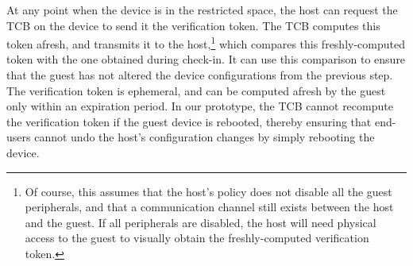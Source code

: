 \begin{mylist}
At any point when the device is in the restricted space, the host can request
the TCB on the device to send it the verification token. The TCB computes this
token afresh, and transmits it to the host,\footnote{Of course, this assumes
that the host's policy does not disable all the guest peripherals, and that a
communication channel still exists between the host and the guest. If all
peripherals are disabled, the host will need physical access to the guest to
visually obtain the freshly-computed verification token.} which compares this
freshly-computed token with the one obtained during check-in. It can use this
comparison to ensure that the guest has not altered the device configurations
from the previous step.  The verification token is ephemeral, and can be
computed afresh by the guest only within an expiration period.  In our
prototype, the TCB cannot recompute the verification token if the guest device
is rebooted, thereby ensuring that end-users cannot undo the host's
configuration changes by simply rebooting the device.
%
\end{mylist}

